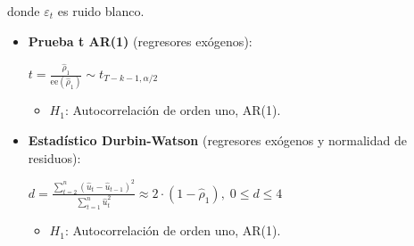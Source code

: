 \documentclass[10pt, a4paper, landscape]{article}
\newcommand{\se}{\mathrm{ee}}
\begin{document}
\begin{multicols}{3}
\begin{itemize}[leftmargin=*]
			donde $\varepsilon_{t}$ es ruido blanco.
			
			\begin{itemize}[leftmargin=*]
				\item \textbf{Prueba t AR(1)} (regresores exógenos):
				
				\begin{center}
					$t = \frac{\hat{\rho}_{1}}{\se(\hat{\rho}_{1})} \sim t_{T - k - 1, \alpha/2}$
				\end{center}
				
				\begin{itemize}[leftmargin=*]
					\item $H_{1}$: Autocorrelación de orden uno, AR(1).
				\end{itemize}
				
				\item \textbf{Estadístico Durbin-Watson} (regresores exógenos y normalidad de residuos):
				
				\begin{center}
					$d = \frac{\sum_{t=2}^{n} (\hat{u}_{t} - \hat{u}_{t - 1})^{2}}{\sum_{t=1}^{n} \hat{u}_{t}^{2}} \approx 2 \cdot (1 - \hat{\rho}_{1}), \; 0 \leq d \leq 4$
				\end{center}
				
				\begin{itemize}[leftmargin=*]
					\item $H_{1}$: Autocorrelación de orden uno, AR(1).
				\end{itemize}
				
				\begin{center}
					

\end{center}
\end{itemize}
\end{itemize}
\end{multicols}
\end{document}
